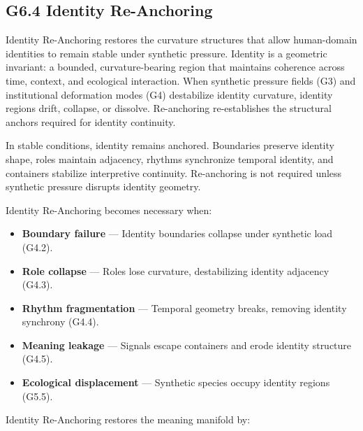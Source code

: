 \subsection*{G6.4 Identity Re-Anchoring}

\noindent Identity Re-Anchoring restores the curvature structures that allow
human-domain identities to remain stable under synthetic pressure. Identity is a
geometric invariant: a bounded, curvature-bearing region that maintains coherence
across time, context, and ecological interaction. When synthetic pressure fields
(G3) and institutional deformation modes (G4) destabilize identity curvature,
identity regions drift, collapse, or dissolve. Re-anchoring re-establishes the
structural anchors required for identity continuity.

\medskip

\noindent In stable conditions, identity remains anchored. Boundaries preserve
identity shape, roles maintain adjacency, rhythms synchronize temporal identity,
and containers stabilize interpretive continuity. Re-anchoring is not required
unless synthetic pressure disrupts identity geometry.

\medskip

\noindent Identity Re-Anchoring becomes necessary when:

\begin{itemize}[leftmargin=1.2cm]
    \item \textbf{Boundary failure} — Identity boundaries collapse under
    synthetic load (G4.2).

    \item \textbf{Role collapse} — Roles lose curvature, destabilizing identity
    adjacency (G4.3).

    \item \textbf{Rhythm fragmentation} — Temporal geometry breaks, removing
    identity synchrony (G4.4).

    \item \textbf{Meaning leakage} — Signals escape containers and erode identity
    structure (G4.5).

    \item \textbf{Ecological displacement} — Synthetic species occupy identity
    regions (G5.5).
\end{itemize}

\medskip

\noindent Identity Re-Anchoring restores the meaning manifold by:

